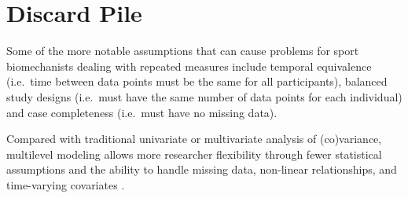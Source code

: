 \documentclass[
]{article}
\begin{document}
\hypertarget{discard-pile}{%
\section{Discard Pile}\label{discard-pile}}

Some of the more notable assumptions that can cause problems for sport biomechanists dealing with repeated measures include temporal equivalence (i.e.~time between data points must be the same for all participants), balanced study designs (i.e.~must have the same number of data points for each individual) and case completeness (i.e.~must have no missing data).

Compared with traditional univariate or multivariate analysis of (co)variance, multilevel modeling allows more researcher flexibility through fewer statistical assumptions and the ability to handle missing data, non-linear relationships, and time-varying covariates \cite{hox2017}.

\newpage
\singlespacing
{}


\end{document}
